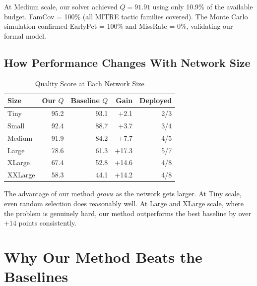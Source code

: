 \documentclass[journal]{IEEEtran}
\begin{document}
At Medium scale, our solver achieved $Q = 91.91$ using only
10.9\% of the available budget.
FamCov = 100\% (all MITRE tactic families covered).
The Monte Carlo simulation confirmed EarlyPct = 100\%
and MissRate = 0\%, validating our formal model.

\subsection{How Performance Changes With Network Size}

\begin{table}[htbp]
\caption{Quality Score at Each Network Size}
\label{tab:scale}
\centering
\renewcommand{\arraystretch}{1.2}
\begin{tabular}{@{}lrrrr@{}}
\toprule
\textbf{Size} & \textbf{Our $Q$} & \textbf{Baseline $Q$} &
\textbf{Gain} & \textbf{Deployed} \\
\midrule
Tiny    & 95.2 & 93.1 &  +2.1 & 2/3 \\
Small   & 92.4 & 88.7 &  +3.7 & 3/4 \\
Medium  & 91.9 & 84.2 &  +7.7 & 4/5 \\
Large   & 78.6 & 61.3 & +17.3 & 5/7 \\
XLarge  & 67.4 & 52.8 & +14.6 & 4/8 \\
XXLarge & 58.3 & 44.1 & +14.2 & 4/8 \\
\bottomrule
\end{tabular}
\end{table}

The advantage of our method \emph{grows} as the network
gets larger.
At Tiny scale, even random selection does reasonably well.
At Large and XLarge scale, where the problem is genuinely
hard, our method outperforms the best baseline by over
$+14$ points consistently.

\section{Why Our Method Beats the Baselines}
\label{sec:dynamics}
\end{document}
